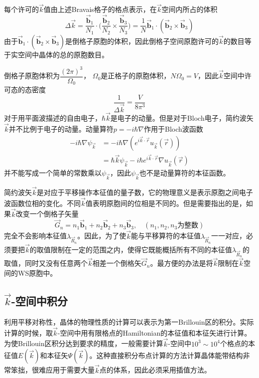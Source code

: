 每个许可的$\vec k$值由上述Bravais格子的格点表示，在$\vec k$空间内所占的体积
\begin{equation}
  \Delta\vec k=\dfrac{\vec{\mathbf b}_1}{N_1}\cdot\biggl(\dfrac{\vec{\mathbf b}_2}{N_2}\times\dfrac{\vec{\mathbf b}_3}{N_3}\biggr)=\dfrac1N\vec{\mathbf b}_1\cdot(\vec{\mathbf b}_2\times\vec{\mathbf b}_3)
  \label{eq:solid-37}
\end{equation}
由于$\vec{\mathbf b}_1\cdot(\vec{\mathbf b}_2\times\vec{\mathbf b}_3)$是倒格子原胞的体积，因此倒格子空间原胞许可的$\vec k$的数目等于实空间中晶体的总的原胞数目。


倒格子原胞体积为$\dfrac{(2\pi)^3}{\Omega_0}$，%
$\Omega_0$是正格子的原胞体积，$N\Omega_0=V$，因此$\vec k$空间中许可态的态密度
\begin{equation}
  \dfrac1{\Delta\vec k}=\dfrac V{8\pi^3}
  \label{eq:solid-38}
\end{equation}
对于用平面波描述的自由电子，$\hbar\vec k$是电子的动量\cite{Yanshousheng}。但是对于Bloch电子，简约波矢$\vec k$并不比例于电子的动量。动量算符$p=-i\hbar\nabla$作用于Bloch波函数%
\begin{equation}
  \begin{split}
  -i\hbar\nabla\psi_{\vec k}&=-i\hbar\nabla(e^{i\vec k\cdot\vec r}u_{\vec k}(\vec r))\\
  &=\hbar\vec k\psi_{\vec k}-i\hbar e^{i\vec k\cdot\vec r}\nabla u_{\vec k}(\vec r)
  \end{split}
  \label{eq:solid-39}
\end{equation}
并不能写成一个简单的常数乘以$\psi_{\vec k}$，因此$\psi_{\vec k}$也不是动量算符的本征函数。


简约波矢$\vec k$是对应于平移操作本征值的量子数，它的物理意义是表示原胞之间电子波函数位相的变化。不同$\vec k$值表明原胞间的位相是不同的。但是需要指出的是，如果$\vec k$改变一个倒格子矢量
\begin{displaymath}
  \vec G_n=n_1\vec{\mathbf b}_1+n_2\vec{\mathbf b}_2+n_3\vec{\mathbf b}_3,\quad(n_1,n_2,n_3\mbox{为整数})
\end{displaymath}
完全不会影响本征值$\lambda_{\vec R_n}$。因此，为了使$\vec k$能与平移算符的本征值$\lambda_{\vec R_n}$一一对应，必须要把$\vec k$的取值限制在一定的范围之内，使得它既能概括所有不同的本征值$\lambda_{\vec R_n}$的取值，同时又没有任意两个$\vec k$相差一个倒格矢$\vec G_n$。最方便的办法是将$\vec k$限制在$\vec k$空间的WS原胞中。

\subsection{$\vec k$-空间中积分}
利用平移对称性，晶体的物理性质的计算可以表示为第一Brillouin区的积分。实际计算的时候，取$\vec k$-空间中用有限格点的Hamiltonian的本征值和本征矢进行计算。为使Brillouin区积分达到要求的精度，一般需要计算$\vec k$-空间中$10^3\sim10^4$个格点的本征值$E(\vec k)$和本征矢$\Psi(\vec k)$。这种直接积分布点计算的方法计算晶体能带结构非常笨拙，很难应用于需要大量$\vec k$点的体系，因此必须采用插值方法。

